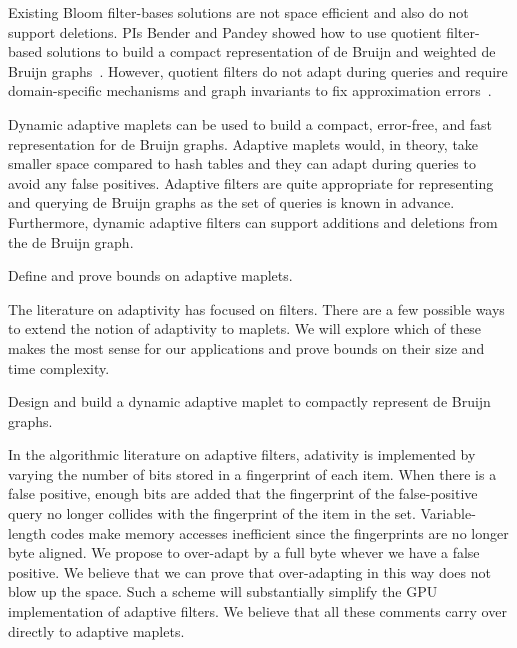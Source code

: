 Existing Bloom filter-bases solutions are not space efficient and also do not support deletions. PIs Bender and Pandey showed how to use quotient filter-based solutions to build a compact representation of de Bruijn and weighted de Bruijn graphs~\cite{PandeyBJP17b}. However, quotient filters do not adapt during queries and require domain-specific mechanisms and graph invariants to fix approximation errors~\cite{PandeyBJP17b}.

Dynamic adaptive maplets can be used to build a compact, error-free, and fast representation for de Bruijn graphs. Adaptive maplets would, in theory, take smaller space compared to hash tables and they can adapt during queries to avoid any false positives. Adaptive filters are quite appropriate for representing and querying de Bruijn graphs as the set of queries is known in advance. Furthermore, dynamic adaptive filters can support \kmer additions and deletions from the de Bruijn graph.

\begin{rproblem}\label{rprob:adaptive-maplet}
Define and prove bounds on adaptive maplets.
\end{rproblem}
The literature on adaptivity has focused on filters.  There are a few possible ways to extend the notion of adaptivity to maplets.  We will explore which of these makes the most sense for our applications and prove bounds on their size and time complexity.

\begin{rproblem}\label{rprob:dyn-apt-filter}
Design and build a dynamic adaptive maplet to compactly represent de Bruijn graphs.
\end{rproblem}

In the algorithmic literature on adaptive filters, adativity is implemented by varying the number of bits stored in a fingerprint of each item.  When there is a false positive, enough bits are added that the fingerprint of the false-positive query no longer collides with the fingerprint of the item in the set.  Variable-length codes make memory accesses inefficient since the fingerprints are no longer byte aligned.  We propose to over-adapt by a full byte whever we have a false positive.  We believe that we can prove that over-adapting in this way does not blow up the space.  Such a scheme will substantially simplify the GPU implementation of adaptive filters.  We believe that all these comments carry over directly to adaptive maplets.


